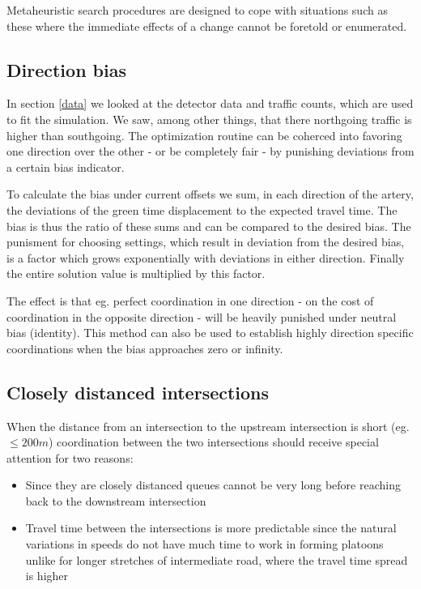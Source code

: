 Metaheuristic search procedures are designed to cope with situations such as these where the immediate effects of a change cannot be foretold or enumerated.

\subsection{Direction bias}
In section \ref{data} we looked at the detector data and traffic counts, which are used to fit the simulation. We saw, among other things, that there northgoing traffic is higher than southgoing. The optimization routine can be coherced into favoring one direction over the other - or be completely fair - by punishing deviations from a certain bias indicator.

To calculate the bias under current offsets we sum, in each direction of the artery, the deviations of the green time displacement to the expected travel time. The bias is thus the ratio of these sums and can be compared to the desired bias. The punisment for choosing settings, which result in deviation from the desired bias, is a factor which grows exponentially with deviations in either direction. Finally the entire solution value is multiplied by this factor.

The effect is that eg. perfect coordination in one direction - on the cost of coordination in the opposite direction - will be heavily punished under neutral bias (identity). This method can also be used to establish highly direction specific coordinations when the bias approaches zero or infinity.

\subsection{Closely distanced intersections}
When the distance from an intersection to the upstream intersection is short (eg. $\leq 200 m$) coordination between the two intersections should receive special attention for two reasons:

\begin{itemize}
\item Since they are closely distanced queues cannot be very long before reaching back to the downstream intersection
\item Travel time between the intersections is more predictable since the natural variations in speeds do not have much time to work in forming platoons unlike for longer stretches of intermediate road, where the travel time spread is higher
\end{itemize}

